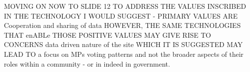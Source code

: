 MOVING ON NOW TO SLIDE 12 TO ADDRESS THE VALUES INSCRIBED IN THE TECHNOLOGY 
I WOULD SUGGEST - PRIMARY VALUES ARE Cooperation and sharing of data
  HOWEVER, THE SAME TECHNOLOGIES THAT enABLe THOSE POSITIVE VALUES
MAY GIVE RISE TO CONCERNS data driven nature of the site 
WHICH IT IS SUGGESTED MAY LEAD TO a focus on MPs voting patterns
      and not the broader aspects of their roles within a community - or in indeed in government.